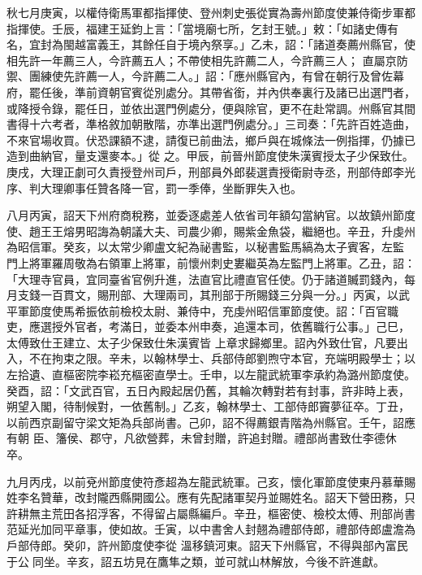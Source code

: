 \begin{pinyinscope}
 秋七月庚寅，以權侍衛馬軍都指揮使、登州刺史張從實為壽州節度使兼侍衛步軍都指揮使。壬辰，福建王延鈞上言：「當境廟七所，乞封王號。」敕：「如諸史傳有名，宜封為閩越富義王，其餘任自于境內祭享。」乙未，詔：「諸道奏薦州縣官，使相先許一年薦三人，今許薦五人；不帶使相先許薦二人，今許薦三人；
 直屬京防禦、團練使先許薦一人，今許薦二人。」詔：「應州縣官內，有曾在朝行及曾佐幕府，罷任後，準前資朝官賓從別處分。其帶省銜，并內供奉裏行及諸已出選門者，或降授令錄，罷任日，並依出選門例處分，便與除官，更不在赴常調。州縣官其間書得十六考者，準格敘加朝散階，亦準出選門例處分。」三司奏：「先許百姓造曲，不來官場收買。伏恐課額不逮，請復已前曲法，鄉戶與在城條法一例指揮，仍據已造到曲納官，量支還麥本。」從
 之。甲辰，前晉州節度使朱漢賓授太子少保致仕。庚戌，大理正劇可久責授登州司戶，刑部員外郎裴選責授衛尉寺丞，刑部侍郎李光序、判大理卿事任贊各降一官，罰一季俸，坐斷罪失入也。



 八月丙寅，詔天下州府商稅務，並委逐處差人依省司年額勾當納官。以故鎮州節度使、趙王王熔男昭誨為朝議大夫、司農少卿，賜紫金魚袋，繼絕也。辛丑，升虔州為昭信軍。癸亥，以太常少卿盧文紀為祕書監，以秘書監馬縞為太子賓客，左監
 門上將軍羅周敬為右領軍上將軍，前懷州刺史婁繼英為左監門上將軍。乙丑，詔：「大理寺官員，宜同臺省官例升進，法直官比禮直官任使。仍于諸道贓罰錢內，每月支錢一百貫文，賜刑部、大理兩司，其刑部于所賜錢三分與一分。」丙寅，以武平軍節度使馬希振依前檢校太尉、兼侍中，充虔州昭信軍節度使。詔：「百官職吏，應選授外官者，考滿日，並委本州申奏，追還本司，依舊職行公事。」己巳，太傅致仕王建立、太子少保致仕朱漢賓皆
 上章求歸鄉里。詔內外致仕官，凡要出入，不在拘束之限。辛未，以翰林學士、兵部侍郎劉煦守本官，充端明殿學士；以左拾遺、直樞密院李崧充樞密直學士。壬申，以左龍武統軍李承約為潞州節度使。癸酉，詔：「文武百官，五日內殿起居仍舊，其輪次轉對若有封事，許非時上表，朔望入閣，待制候對，一依舊制。」乙亥，翰林學士、工部侍郎竇夢征卒。丁丑，以前西京副留守梁文矩為兵部尚書。己卯，詔不得薦銀青階為州縣官。壬午，詔應有朝
 臣、籓侯、郡守，凡欲營葬，未曾封贈，許追封贈。禮部尚書致仕李德休卒。



 九月丙戌，以前兗州節度使符彥超為左龍武統軍。己亥，懷化軍節度使東丹慕華賜姓李名贊華，改封隴西縣開國公。應有先配諸軍契丹並賜姓名。詔天下營田務，只許耕無主荒田各招浮客，不得留占屬縣編戶。辛丑，樞密使、檢校太傅、刑部尚書范延光加同平章事，使如故。壬寅，以中書舍人封翹為禮部侍郎，禮部侍郎盧澹為戶部侍郎。癸卯，許州節度使李從
 溫移鎮河東。詔天下州縣官，不得與部內富民于公同坐。辛亥，詔五坊見在鷹隼之類，並可就山林解放，今後不許進獻。




\end{pinyinscope}
